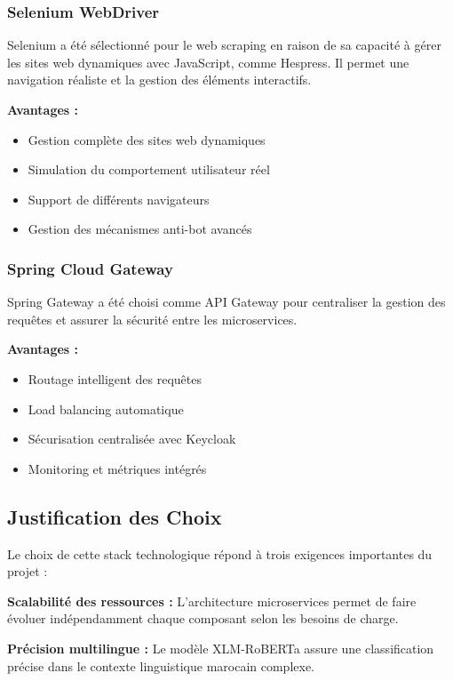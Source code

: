 \subsubsection{Selenium WebDriver}

Selenium a été sélectionné pour le web scraping en raison de sa capacité à gérer les sites web dynamiques avec JavaScript, comme Hespress. Il permet une navigation réaliste et la gestion des éléments interactifs.

\textbf{Avantages :}
\begin{itemize}
    \item Gestion complète des sites web dynamiques
    \item Simulation du comportement utilisateur réel
    \item Support de différents navigateurs
    \item Gestion des mécanismes anti-bot avancés
\end{itemize}

\subsubsection{Spring Cloud Gateway}

Spring Gateway a été choisi comme API Gateway pour centraliser la gestion des requêtes et assurer la sécurité entre les microservices.

\textbf{Avantages :}
\begin{itemize}
    \item Routage intelligent des requêtes
    \item Load balancing automatique
    \item Sécurisation centralisée avec Keycloak
    \item Monitoring et métriques intégrés
\end{itemize}

\subsection{Justification des Choix}

Le choix de cette stack technologique répond à trois exigences importantes du projet :

\textbf{Scalabilité des ressources :} L'architecture microservices permet de faire évoluer indépendamment chaque composant selon les besoins de charge.

\textbf{Précision multilingue :} Le modèle XLM-RoBERTa assure une classification précise dans le contexte linguistique marocain complexe.

